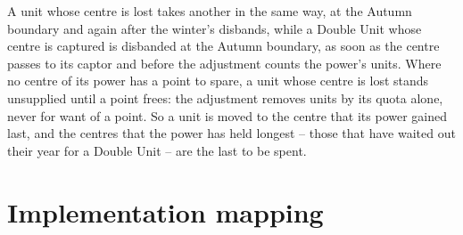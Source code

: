 \documentclass[12pt,a4paper]{article}
\begin{document}
A unit whose centre is lost takes another in the same way, at the Autumn boundary and again after the winter's disbands, while a Double Unit whose centre is captured is disbanded at the Autumn boundary, as soon as the centre passes to its captor and before the adjustment counts the power's units.
Where no centre of its power has a point to spare, a unit whose centre is lost stands unsupplied until a point frees: the adjustment removes units by its quota alone, never for want of a point.
So a unit is moved to the centre that its power gained last, and the centres that the power has held longest -- those that have waited out their year for a Double Unit -- are the last to be spent.

\section{Implementation mapping}\label{sec:10}
\end{document}
